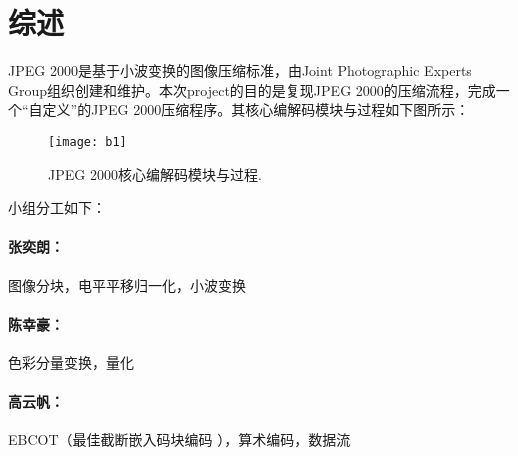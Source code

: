 \section{综述}
JPEG 2000是基于小波变换的图像压缩标准，由Joint Photographic Experts Group组织创建和维护。本次project的目的是复现JPEG 2000的压缩流程，完成一个“自定义”的JPEG 2000压缩程序。其核心编解码模块与过程如下图所示：\par

\begin{figure}[H]
	\centering
	\texttt{[image: b1]}
	\caption{JPEG 2000核心编解码模块与过程.}
	\label{b1}
\end{figure}

小组分工如下：
\paragraph{张奕朗：} 图像分块，电平平移归一化，小波变换
\paragraph{陈幸豪：} 色彩分量变换，量化
\paragraph{高云帆：} EBCOT（最佳截断嵌入码块编码 ），算术编码，数据流
